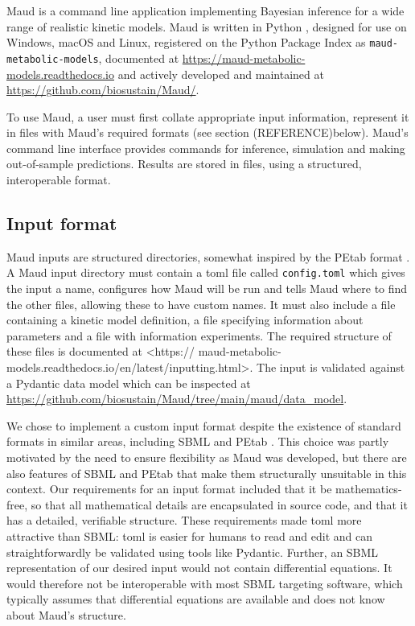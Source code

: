 \documentclass[journal=,manuscript=]{achemso}
\begin{document}
Maud is a command line application implementing Bayesian inference for a
wide range of realistic kinetic models. Maud is written in Python
\citep{vanrossumPythonReferenceManual2009}, designed for use on Windows,
macOS and Linux, registered on the Python Package Index as
\texttt{maud-metabolic-models}, documented at
\url{https://maud-metabolic-models.readthedocs.io} and actively
developed and maintained at \url{https://github.com/biosustain/Maud/}.

To use Maud, a user must first collate appropriate input information,
represent it in files with Maud's required formats (see section
(REFERENCE)below). Maud's command line interface provides commands for
inference, simulation and making out-of-sample predictions. Results are
stored in files, using a structured, interoperable format.

\hypertarget{input-format}{%
\subsection{Input format}\label{input-format}}

Maud inputs are structured directories, somewhat inspired by the PEtab
format \citep{SchmiesterSch2021}. A Maud input directory must contain a
toml \citep{preston-wernertomandgedampradyunTOMLSpecification0rc2020}
file called \texttt{config.toml} which gives the input a name,
configures how Maud will be run and tells Maud where to find the other
files, allowing these to have custom names. It must also include a file
containing a kinetic model definition, a file specifying information
about parameters and a file with information experiments. The required
structure of these files is documented at \textless https://
maud-metabolic-models.readthedocs.io/en/latest/inputting.html\textgreater.
The input is validated against a Pydantic
\citep{pydanticdevelopersPydantic2022} data model which can be inspected
at \url{https://github.com/biosustain/Maud/tree/main/maud/data_model}.

We chose to implement a custom input format despite the existence of
standard formats in similar areas, including SBML
\citep{keatingSBMLLevelExtensible2020} and PEtab
\citep{SchmiesterSch2021}. This choice was partly motivated by the need
to ensure flexibility as Maud was developed, but there are also features
of SBML and PEtab that make them structurally unsuitable in this
context. Our requirements for an input format included that it be
mathematics-free, so that all mathematical details are encapsulated in
source code, and that it has a detailed, verifiable structure. These
requirements made toml more attractive than SBML: toml is easier for
humans to read and edit and can straightforwardly be validated using
tools like Pydantic. Further, an SBML representation of our desired
input would not contain differential equations. It would therefore not
be interoperable with most SBML targeting software, which typically
assumes that differential equations are available and does not know
about Maud's structure.
\end{document}
